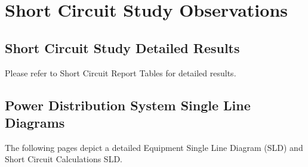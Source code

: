 \section{Short Circuit Study Observations}
\label{af:sccobservations}

\subsection{Short Circuit Study Detailed Results}
\label{af:observations:at}

Please refer to Short Circuit Report Tables for detailed results.

\pagebreak

\subsection{Power Distribution System Single Line Diagrams}
\label{af:observations:sld}

The following pages depict a detailed Equipment Single Line Diagram (SLD) and Short Circuit Calculations SLD.